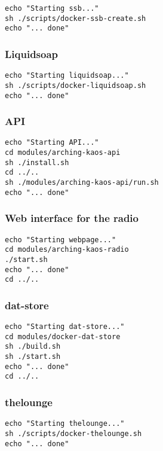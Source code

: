 \documentclass[12pt]{report}
\begin{document}
\begin{verbatim}
echo "Starting ssb..."
sh ./scripts/docker-ssb-create.sh
echo "... done"
\end{verbatim}


\subsubsection{Liquidsoap}\label{liquidsoap-1}

\begin{verbatim}
echo "Starting liquidsoap..."
sh ./scripts/docker-liquidsoap.sh
echo "... done"
\end{verbatim}


\subsubsection{API}\label{api-1}

\begin{verbatim}
echo "Starting API..."
cd modules/arching-kaos-api
sh ./install.sh
cd ../..
sh ./modules/arching-kaos-api/run.sh
echo "... done"
\end{verbatim}


\subsubsection{Web interface for the
radio}\label{web-interface-for-the-radio}

\begin{verbatim}
echo "Starting webpage..."
cd modules/arching-kaos-radio
./start.sh
echo "... done"
cd ../..
\end{verbatim}


\subsubsection{dat-store}\label{dat-store}

\begin{verbatim}
echo "Starting dat-store..."
cd modules/docker-dat-store
sh ./build.sh
sh ./start.sh
echo "... done"
cd ../..
\end{verbatim}


\subsubsection{thelounge}\label{thelounge}

\begin{verbatim}
echo "Starting thelounge..."
sh ./scripts/docker-thelounge.sh
echo "... done"
\end{verbatim}
\end{document}
